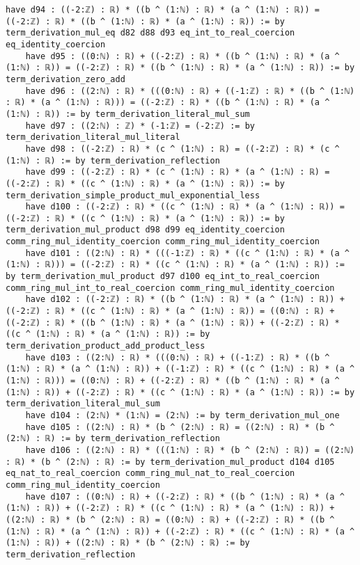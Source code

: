 \documentclass{article}
\begin{document}
\begin{tcolorbox}[colback=white!10, width=\linewidth]
\begin{lstlisting}[language=Lean4]
    have d94 : ((-2:ℤ) : ℝ) * ((b ^ (1:ℕ) : ℝ) * (a ^ (1:ℕ) : ℝ)) = ((-2:ℤ) : ℝ) * ((b ^ (1:ℕ) : ℝ) * (a ^ (1:ℕ) : ℝ)) := by term_derivation_mul_eq d82 d88 d93 eq_int_to_real_coercion eq_identity_coercion
    have d95 : ((0:ℕ) : ℝ) + ((-2:ℤ) : ℝ) * ((b ^ (1:ℕ) : ℝ) * (a ^ (1:ℕ) : ℝ)) = ((-2:ℤ) : ℝ) * ((b ^ (1:ℕ) : ℝ) * (a ^ (1:ℕ) : ℝ)) := by term_derivation_zero_add
    have d96 : ((2:ℕ) : ℝ) * (((0:ℕ) : ℝ) + ((-1:ℤ) : ℝ) * ((b ^ (1:ℕ) : ℝ) * (a ^ (1:ℕ) : ℝ))) = ((-2:ℤ) : ℝ) * ((b ^ (1:ℕ) : ℝ) * (a ^ (1:ℕ) : ℝ)) := by term_derivation_literal_mul_sum
    have d97 : ((2:ℕ) : ℤ) * (-1:ℤ) = (-2:ℤ) := by term_derivation_literal_mul_literal
    have d98 : ((-2:ℤ) : ℝ) * (c ^ (1:ℕ) : ℝ) = ((-2:ℤ) : ℝ) * (c ^ (1:ℕ) : ℝ) := by term_derivation_reflection
    have d99 : ((-2:ℤ) : ℝ) * (c ^ (1:ℕ) : ℝ) * (a ^ (1:ℕ) : ℝ) = ((-2:ℤ) : ℝ) * ((c ^ (1:ℕ) : ℝ) * (a ^ (1:ℕ) : ℝ)) := by term_derivation_simple_product_mul_exponential_less
    have d100 : ((-2:ℤ) : ℝ) * ((c ^ (1:ℕ) : ℝ) * (a ^ (1:ℕ) : ℝ)) = ((-2:ℤ) : ℝ) * ((c ^ (1:ℕ) : ℝ) * (a ^ (1:ℕ) : ℝ)) := by term_derivation_mul_product d98 d99 eq_identity_coercion comm_ring_mul_identity_coercion comm_ring_mul_identity_coercion
    have d101 : ((2:ℕ) : ℝ) * (((-1:ℤ) : ℝ) * ((c ^ (1:ℕ) : ℝ) * (a ^ (1:ℕ) : ℝ))) = ((-2:ℤ) : ℝ) * ((c ^ (1:ℕ) : ℝ) * (a ^ (1:ℕ) : ℝ)) := by term_derivation_mul_product d97 d100 eq_int_to_real_coercion comm_ring_mul_int_to_real_coercion comm_ring_mul_identity_coercion
    have d102 : ((-2:ℤ) : ℝ) * ((b ^ (1:ℕ) : ℝ) * (a ^ (1:ℕ) : ℝ)) + ((-2:ℤ) : ℝ) * ((c ^ (1:ℕ) : ℝ) * (a ^ (1:ℕ) : ℝ)) = ((0:ℕ) : ℝ) + ((-2:ℤ) : ℝ) * ((b ^ (1:ℕ) : ℝ) * (a ^ (1:ℕ) : ℝ)) + ((-2:ℤ) : ℝ) * ((c ^ (1:ℕ) : ℝ) * (a ^ (1:ℕ) : ℝ)) := by term_derivation_product_add_product_less
    have d103 : ((2:ℕ) : ℝ) * (((0:ℕ) : ℝ) + ((-1:ℤ) : ℝ) * ((b ^ (1:ℕ) : ℝ) * (a ^ (1:ℕ) : ℝ)) + ((-1:ℤ) : ℝ) * ((c ^ (1:ℕ) : ℝ) * (a ^ (1:ℕ) : ℝ))) = ((0:ℕ) : ℝ) + ((-2:ℤ) : ℝ) * ((b ^ (1:ℕ) : ℝ) * (a ^ (1:ℕ) : ℝ)) + ((-2:ℤ) : ℝ) * ((c ^ (1:ℕ) : ℝ) * (a ^ (1:ℕ) : ℝ)) := by term_derivation_literal_mul_sum
    have d104 : (2:ℕ) * (1:ℕ) = (2:ℕ) := by term_derivation_mul_one
    have d105 : ((2:ℕ) : ℝ) * (b ^ (2:ℕ) : ℝ) = ((2:ℕ) : ℝ) * (b ^ (2:ℕ) : ℝ) := by term_derivation_reflection
    have d106 : ((2:ℕ) : ℝ) * (((1:ℕ) : ℝ) * (b ^ (2:ℕ) : ℝ)) = ((2:ℕ) : ℝ) * (b ^ (2:ℕ) : ℝ) := by term_derivation_mul_product d104 d105 eq_nat_to_real_coercion comm_ring_mul_nat_to_real_coercion comm_ring_mul_identity_coercion
    have d107 : ((0:ℕ) : ℝ) + ((-2:ℤ) : ℝ) * ((b ^ (1:ℕ) : ℝ) * (a ^ (1:ℕ) : ℝ)) + ((-2:ℤ) : ℝ) * ((c ^ (1:ℕ) : ℝ) * (a ^ (1:ℕ) : ℝ)) + ((2:ℕ) : ℝ) * (b ^ (2:ℕ) : ℝ) = ((0:ℕ) : ℝ) + ((-2:ℤ) : ℝ) * ((b ^ (1:ℕ) : ℝ) * (a ^ (1:ℕ) : ℝ)) + ((-2:ℤ) : ℝ) * ((c ^ (1:ℕ) : ℝ) * (a ^ (1:ℕ) : ℝ)) + ((2:ℕ) : ℝ) * (b ^ (2:ℕ) : ℝ) := by term_derivation_reflection

\end{lstlisting}
\end{tcolorbox}
\end{document}
